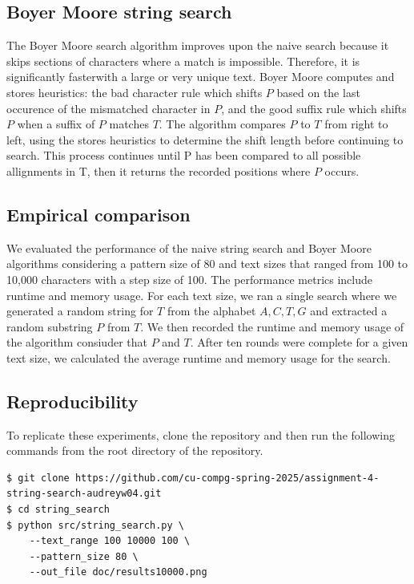 \documentclass[11pt, letterpaper]{article}
\begin{document}
\subsection{Boyer Moore string search}
The Boyer Moore search algorithm improves upon the naive search because it 
skips sections of characters where a match is impossible. Therefore, it is 
significantly fasterwith a large or very unique text. Boyer Moore computes 
and stores heuristics: the bad character rule which shifts $P$ based on the 
last occurence of the mismatched character in $P$, and the good suffix rule 
which shifts $P$ when a suffix of $P$ matches $T$. The algorithm compares $P$ 
to $T$ from right to left, using the stores heuristics to determine the shift 
length before continuing to search. This process continues until P has been 
compared to all possible allignments in T, then it returns the recorded 
positions where $P$ occurs.

\subsection{Empirical comparison}
We evaluated the performance of the naive string search and Boyer Moore 
algorithms considering a pattern size of 80 and text sizes that ranged 
from 100 to 10,000 characters with a step size of 100.  The performance 
metrics include runtime and memory usage. For each text size, we ran a 
single search where we generated a random string for $T$ from the alphabet 
${A, C, T, G}$ and extracted a random substring $P$ from $T$. We then 
recorded the runtime and memory usage of the algorithm consiuder that $P$ 
and $T$. After ten rounds were complete for a given text size, we calculated 
the average runtime and memory usage for the search.

\subsection{Reproducibility}
To replicate these experiments, clone the repository and then run the
following commands from the root directory of the repository.

\begin{verbatim}
$ git clone https://github.com/cu-compg-spring-2025/assignment-4-string-search-audreyw04.git
$ cd string_search
$ python src/string_search.py \
    --text_range 100 10000 100 \
    --pattern_size 80 \
    --out_file doc/results10000.png
\end{verbatim}
\end{document}
